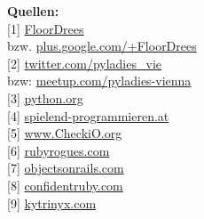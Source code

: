 \documentclass[10pt,a4paper,ngerman,twoside]{article} %
\newcommand{\SepRule}{\noindent	%
\begin{center}
\rule{250pt}{1pt} %
\end{center}
}
\begin{document}
\begin{multicols}{3}
\textbf{Quellen:} \\
{[}1{]} \href{https://twitter.com/FloorDrees}{FloorDrees} \\
bzw.    \href{https://plus.google.com/+FloorDrees/about}{plus.google.com/+FloorDrees} \\
{[}2{]} \href{https://twitter.com/pyladies_vie}{twitter.com/pyladies\_vie} \\
bzw: \href{http://www.meetup.com/pyladies-vienna}{meetup.com/pyladies-vienna} \\
{[}3{]} \href{http://python.org}{python.org} \\
{[}4{]} \href{http://spielend-programmieren.at}{spielend-programmieren.at} \\
{[}5{]} \href{http://www.checkio.org/}{www.CheckiO.org} \\
{[}6{]} \href{http://rubyrogues.com/}{rubyrogues.com} \\
{[}7{]} \href{http://objectsonrails.com/}{objectsonrails.com} \\
{[}8{]} \href{http://www.confidentruby.com/}{confidentruby.com} \\
{[}9{]} \href{http://kytrinyx.com/}{kytrinyx.com} 

\end{multicols}
\end{document}
